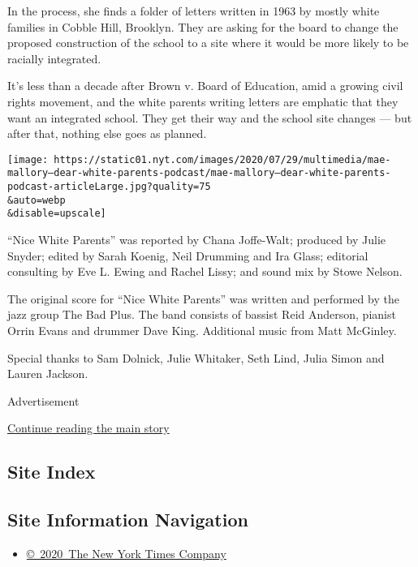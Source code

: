 In the process, she finds a folder of letters written in 1963 by mostly
white families in Cobble Hill, Brooklyn. They are asking for the board
to change the proposed construction of the school to a site where it
would be more likely to be racially integrated.

It's less than a decade after Brown v. Board of Education, amid a
growing civil rights movement, and the white parents writing letters are
emphatic that they want an integrated school. They get their way and the
school site changes --- but after that, nothing else goes as planned.

\texttt{[image: https://static01.nyt.com/images/2020/07/29/multimedia/mae-mallory--dear-white-parents-podcast/mae-mallory--dear-white-parents-podcast-articleLarge.jpg?quality=75\\\&auto=webp\\\&disable=upscale]}

``Nice White Parents'' was reported by Chana Joffe-Walt; produced by
Julie Snyder; edited by Sarah Koenig, Neil Drumming and Ira Glass;
editorial consulting by Eve L. Ewing and Rachel Lissy; and sound mix by
Stowe Nelson.

The original score for ``Nice White Parents'' was written and performed
by the jazz group The Bad Plus. The band consists of bassist Reid
Anderson, pianist Orrin Evans and drummer Dave King. Additional music
from Matt McGinley.

Special thanks to Sam Dolnick, Julie Whitaker, Seth Lind, Julia Simon
and Lauren Jackson.

Advertisement

\protect\hyperlink{after-bottom}{Continue reading the main story}

\hypertarget{site-index}{%
\subsection{Site Index}\label{site-index}}

\hypertarget{site-information-navigation}{%
\subsection{Site Information
Navigation}\label{site-information-navigation}}

\begin{itemize}
\tightlist
\item
  \href{https://help.nytimes.com/hc/en-us/articles/115014792127-Copyright-notice}{©~2020~The
  New York Times Company}
\end{itemize}

